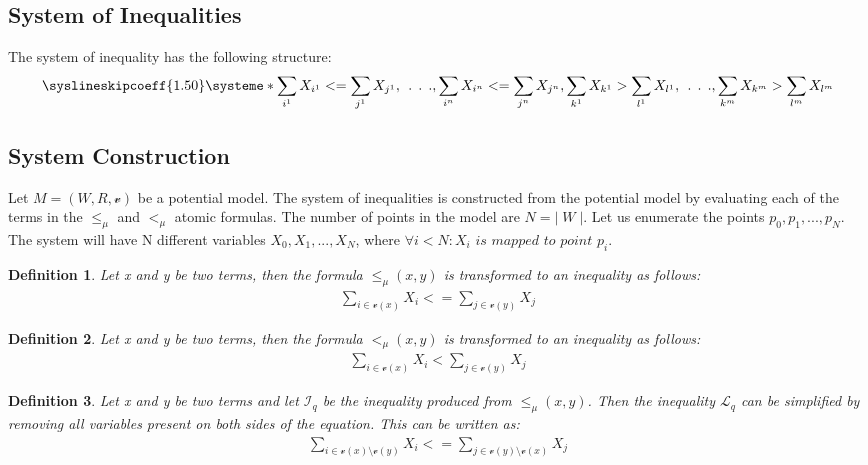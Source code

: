 \documentclass{article}
\newtheorem{defn}{Definition}[section]
\newcommand{\vE}{\mathscr{v}}
\begin{document}
	\subsection{System of Inequalities} 
		The system of inequality has the following structure:
		\[
			\syslineskipcoeff{1.50}
			\systeme*{\sum_{i^1} X_{i^1} <= \sum_{j^1} X_{j^1},
				\:\:.\:\:.\:\:.,
				\sum_{i^n} X_{i^n} <= \sum_{j^n} X_{j^n}, 
				\sum_{k^1} X_{k^1} > \sum_{l^1} X_{l^1},
				\:\:.\:\:.\:\:.,
				\sum_{k^m} X_{k^m} > \sum_{l^m} X_{l^m}
				}
		\]

		\leavevmode\newline
		\subsection{System Construction}
		Let $M = (W, R, \vE)$ be a potential model. The system of inequalities is constructed from the potential model by evaluating each
		of the terms in the $\le_\mu$ and $<_\mu$ atomic formulas. The number of points in the model are $N = | \; W \; |$. Let us enumerate the points
		$p_0, p_1, ..., p_N$. The system will have N different variables $X_0, X_1, ..., X_N$, 
		where $\forall i < N: X_i \textit{ is mapped to point }p_i$.

		\begin{defn}
			Let x and y be two terms, then the formula $\le_\mu(x, y)$ is transformed to an inequality as follows:
			\begin{align*}
				\sum_{i \in \vE(x)} X_i <= \sum_{j \in \vE(y)} X_j
			\end{align*}
		\end{defn}

		\begin{defn}
			Let x and y be two terms, then the formula $<_\mu(x, y)$ is transformed to an inequality as follows:
			\begin{align*}
				\sum_{i \in \vE(x)} X_i < \sum_{j \in \vE(y)} X_j
			\end{align*}
		\end{defn}

		\begin{defn}
			Let x and y be two terms and let $\mathscr{I}_q$ be the inequality produced from $\le_\mu(x, y)$. Then the inequality $\mathscr{L}_q$ can be simplified 
			by removing all variables present on both sides of the equation. This can be written as:
			\begin{align*}
				\sum_{i \in \vE(x) \setminus \vE(y)} X_i <= \sum_{j \in \vE(y) \setminus \vE(x)} X_j
			\end{align*}
		\end{defn}
\end{document}
